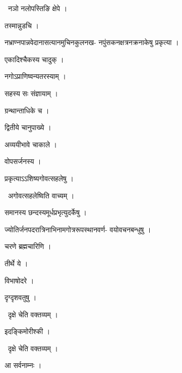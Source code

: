 \documentclass[10pt, openany, oneside]{book}
\begin{document}
\par\noindent\hspace{1.5em}{\vps वा॰}~{\qt नञो नलोपस्तिङि क्षेपे ।}

\noindent तस्मान्नुडचि ।

\noindent नभ्राण्नपान्नवेदानासत्यानमुचिनकुलनख- नपुंसकनक्षत्रनक्रनाकेषु प्रकृत्या ।

\noindent एकादिश्चैकस्य चादुक् ।

\noindent नगोऽप्राणिष्वन्यतरस्याम् ।

\noindent सहस्य सः संज्ञायाम् ।

\noindent ग्रन्थान्ताधिके च ।

\noindent द्वितीये चानुपाख्ये ।

\noindent अव्ययीभावे चाकाले ।

\noindent वोपसर्जनस्य ।

\noindent प्रकृत्याऽऽशिष्यगोवत्सहलेषु ।

\par\noindent\hspace{1.5em}{\vps वा॰}~{\qt अगोवत्सहलेष्विति वाच्यम् ।}

\noindent समानस्य छन्दस्यमूर्धप्रभृत्युदर्केषु ।

\noindent ज्योतिर्जनपदरात्रिनाभिनामगोत्ररूपस्थानवर्ण- वयोवचनबन्धुषु ।

\noindent चरणे ब्रह्मचारिणि ।

\noindent तीर्थे ये ।

\noindent विभाषोदरे ।

\noindent दृग्दृशवतुषु ।

\par\noindent\hspace{1.5em}{\vps वा॰}~{\qt दृक्षे चेति वक्तव्यम् ।}

\noindent इदङ्किमोरीश्की ।

\par\noindent\hspace{1.5em}{\vps वा॰}~{\qt दृक्षे चेति वक्तव्यम् ।}

\noindent आ सर्वनाम्नः ।
\end{document}
